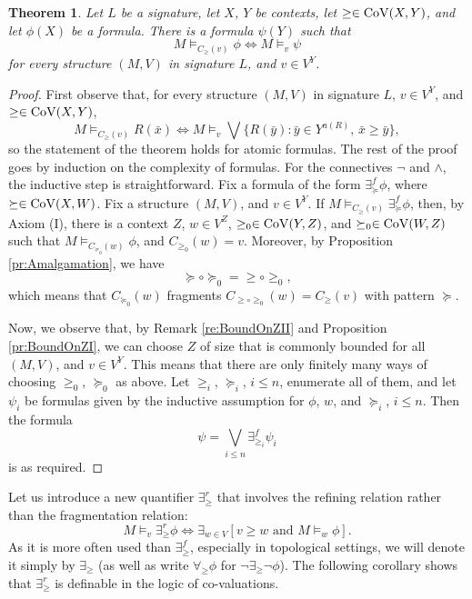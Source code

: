 \documentclass[12pt]{amsart}
\theoremstyle{plain}
\newtheorem{theorem}{Theorem}[section]
\newcommand \Val{{\rm{CoV}}}
\newcommand \fr{\scriptscriptstyle{f}}
\newcommand \re{\scriptstyle{r}}
\begin{document}
\begin{theorem}
	\label{th:SequenceDetermines}
	Let $L$ be a signature, let $X$, $Y$ be contexts, let $\geq \in \Val(X,Y)$, and let $\phi(X)$ be a formula. There is a formula $\psi(Y)$ such that $$M \vDash_{C_\geq(v)} \phi \iff M \vDash_v \psi$$ for every structure $(M,V)$ in signature $L$, and $v \in V^Y$.
\end{theorem}

\begin{proof}
First observe that, for every structure $(M,V)$ in signature $L$, $v \in V^Y$, and $\geq \in \Val(X,Y)$,
	\[ M \models_{C_\geq(v)} R(\bar{x}) \iff M \models_v \bigvee \{ R(\bar{y}): \bar{y} \in Y^{a(R)}, \, \bar{x} \geq \bar{y}  \},  \]
	so the statement of the theorem holds for atomic formulas. The rest of the proof goes by induction on the complexity of formulas. For the connectives $\neg$ and $\land$, the inductive step is straightforward.
	Fix a formula of the form $\exists^{\fr}_\succeq \phi$, where $\succeq \in \Val(X,W)$. Fix a structure $(M,V)$, and $v \in V^Y$.  If $M \vDash_{C_\geq(v)} \exists^{\fr}_\succeq \phi$, then, by Axiom (I), there is a context $Z$,  $w \in V^Z$, $\geq_0 \in \Val(Y,Z)$, and $\succeq_0 \in \Val(W,Z)$ such that $M \vDash_{C_{\succeq_0}(w)} \phi$, and $C_{\geq_0}(w)=v$. %
	Moreover, by Proposition \ref{pr:Amalgamation}, we have $$\succeq \circ \succeq_0 = \geq \circ \geq_0,$$ which means that $C_{\succeq_0}(w)$ fragments $C_{\geq \circ \geq_0}(w)=C_{\geq}(v)$ with pattern $\succeq$. %
	
	Now, we observe that, by Remark \ref{re:BoundOnZII} and  Proposition \ref{pr:BoundOnZI}, we can choose $Z$ of size that is commonly bounded for all $(M,V)$, and $v \in V^Y$. This means that there are only finitely many ways of choosing $\geq_0$, $\succeq_0$ as above. Let $\geq_i$, $\succeq_i$, $i \leq n$, enumerate all of them, and let $\psi_i$ be formulas given by the inductive assumption for $\phi$, $w$, and $\succeq_i$, $i \leq n$. 
	Then the formula $$\psi=\bigvee_{i \leq n} \exists^{\fr}_{\geq_i} \psi_i$$ is as required.
\end{proof}

Let us  introduce a new quantifier $\exists^{\re}_{\geq}$ that involves the refining relation rather than the fragmentation relation:
%
\[ M \vDash_v \exists^{\re}_{\geq} \phi \iff
\exists_{w \in V}[v \geq w \mbox{ and } M \vDash_w \phi]. \]
%
As it is more often used than $\exists^{\fr}_{\geq}$, especially in topological settings,  we will denote it  simply by $\exists_{\geq}$ (as well as write $\forall_\geq \phi$ for $\neg \exists_\geq \neg \phi$). The following corollary shows that  $\exists^{\re}_{\geq}$ is definable in the logic of co-valuations.
\end{document}
